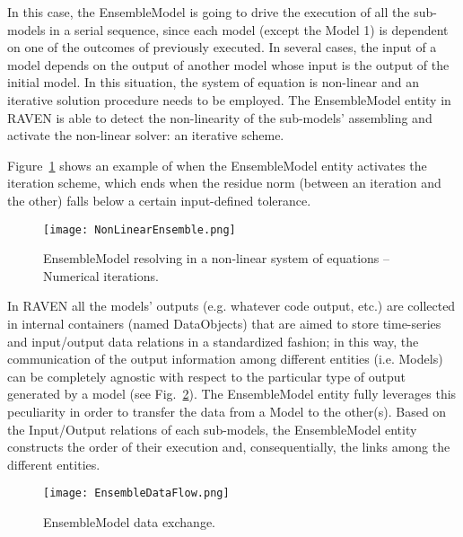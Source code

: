 In this case, the EnsembleModel is going to drive the execution of all the sub-models in a serial sequence, 
since each model (except the Model 1) is dependent on one of the outcomes of previously executed.
In several cases, the input of a model depends on the output of another model whose input is the output 
of the initial model. In this situation, the system of equation is non-linear and an iterative solution 
procedure needs to be employed. The EnsembleModel entity in RAVEN is able to detect the non-linearity of 
the sub-models’ assembling and activate the non-linear solver: an iterative scheme. 

Figure~\ref{fig:exampleEnsembleModelNonLinear} shows an example 
of when the EnsembleModel entity activates the iteration scheme, which ends when the residue norm 
(between an iteration and the other) falls below a certain input-defined tolerance.

 \begin{figure}
    \centering
    \centerline{\texttt{[image: NonLinearEnsemble.png]}} 
    \caption{EnsembleModel resolving in a non-linear system of equations – Numerical iterations.}
    \label{fig:exampleEnsembleModelNonLinear}
\end{figure}

In RAVEN all the models’ outputs (e.g. whatever code output, etc.) are collected in internal containers 
(named DataObjects) that are aimed to store time-series and input/output data relations in a standardized 
fashion; in this way, the communication of the output information among different entities (i.e. Models) 
can be completely agnostic with respect to the particular type of output generated by a 
model (see Fig.~\ref{fig:exampleEnsembleModelData}). 
The EnsembleModel entity fully leverages this peculiarity in order to transfer the data from a Model to the other(s). 
Based on the Input/Output relations of each sub-models, the EnsembleModel entity constructs the order of 
their execution and, consequentially, the links among the different entities.

 \begin{figure}
    \centering
    \centerline{\texttt{[image: EnsembleDataFlow.png]}} 
    \caption{EnsembleModel data exchange.}
    \label{fig:exampleEnsembleModelData}
\end{figure}


 